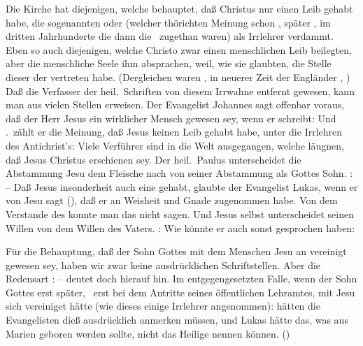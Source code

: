 \begin{aufza}
\item Die Kirche hat diejenigen, welche behauptet, daß Christus nur einen  Leib gehabt habe, die sogenannten  oder  (welcher thörichten Meinung schon , später , im dritten Jahrhunderte die  dann die  \umA\  zugethan waren) als Irrlehrer verdammt. Eben so auch diejenigen, welche Christo zwar einen menschlichen Leib beilegten, aber die menschliche Seele ihm absprachen, weil, wie sie glaubten, die Stelle dieser der  vertreten habe. (Dergleichen  waren , in neuerer Zeit der Engländer , \uA ) Daß die Verfasser der heil.\ Schriften von diesem Irrwahne entfernt gewesen, kann man aus vielen Stellen erweisen. Der Evangelist Johannes sagt offenbar voraus, daß der Herr Jesus ein wirklicher Mensch gewesen sey, wenn er  schreibt:  Und .\ zählt er die Meinung, daß Jesus keinen Leib gehabt habe, unter die Irrlehren des Antichrist's: Viele Verführer sind in die Welt ausgegangen, welche läugnen, daß Jesus Christus  erschienen sey. Der heil.\ Paulus unterscheidet die Abstammung Jesu dem Fleische nach von seiner Abstammung als Gottes Sohn. :  -- Daß Jesus insonderheit auch eine  gehabt, glaubte der Evangelist Lukas, wenn er von Jesu sagt (), daß er an Weisheit und Gnade zugenommen habe. Von dem Verstande des  konnte man das nicht sagen. Und Jesus selbst unterscheidet seinen Willen von dem Willen des Vaters. :  Wie könnte er auch sonst gesprochen haben: 
\item Für die Behauptung, daß der Sohn Gottes mit dem Menschen Jesu  an vereinigt gewesen sey, haben wir zwar keine ausdrücklichen Schriftstellen. Aber die Redensart :  -- deutet doch hierauf hin. Im entgegengesetzten Falle, wenn der Sohn Gottes erst später, \zB\ erst bei dem Antritte seines öffentlichen Lehramtes, mit Jesu sich vereiniget hätte (wie dieses einige Irrlehrer angenommen): hätten die Evangelisten dieß ausdrücklich anmerken müssen, und Lukas hätte das, was aus Marien geboren werden sollte, nicht das Heilige nennen können. ()

\end{aufza}
